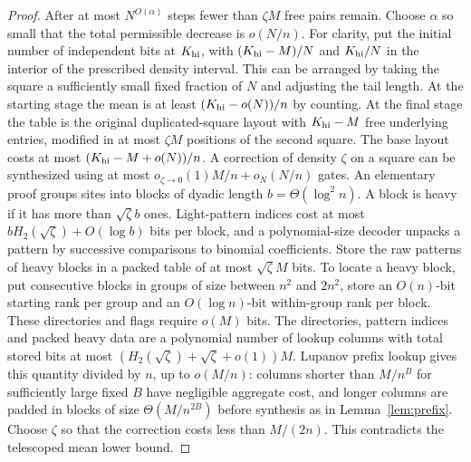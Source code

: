 \documentclass[11pt]{article}
\begin{document}
\begin{proof}
After at most $N^{O(\alpha)}$ steps fewer than $\zeta M$ free pairs remain. Choose $\alpha$ so small that the total permissible decrease is $o(N/n)$. For clarity, put the initial number of independent bits at $K_{\rm hi}$, with $(K_{\rm hi}-M)/N$ and $K_{\rm hi}/N$ in the interior of the prescribed density interval. This can be arranged by taking the square a sufficiently small fixed fraction of $N$ and adjusting the tail length. At the starting stage the mean is at least $(K_{\rm hi}-o(N))/n$ by counting. At the final stage the table is the original duplicated-square layout with $K_{\rm hi}-M$ free underlying entries, modified in at most $\zeta M$ positions of the second square. The base layout costs at most $(K_{\rm hi}-M+o(N))/n$. A correction of density $\zeta$ on a square can be synthesized using at most $o_{\zeta\to0}(1)M/n+o_N(N/n)$ gates. An elementary proof groups sites into blocks of dyadic length $b=\Theta(\log^2 n)$. A block is heavy if it has more than $\sqrt\zeta b$ ones. Light-pattern indices cost at most $bH_2(\sqrt\zeta)+O(\log b)$ bits per block, and a polynomial-size decoder unpacks a pattern by successive comparisons to binomial coefficients. Store the raw patterns of heavy blocks in a packed table of at most $\sqrt\zeta M$ bits. To locate a heavy block, put consecutive blocks in groups of size between $n^2$ and $2n^2$, store an $O(n)$-bit starting rank per group and an $O(\log n)$-bit within-group rank per block. These directories and flags require $o(M)$ bits. The directories, pattern indices and packed heavy data are a polynomial number of lookup columns with total stored bits at most $(H_2(\sqrt\zeta)+\sqrt\zeta+o(1))M$. Lupanov prefix lookup gives this quantity divided by $n$, up to $o(M/n)$: columns shorter than $M/n^B$ for sufficiently large fixed $B$ have negligible aggregate cost, and longer columns are padded in blocks of size $\Theta(M/n^{2B})$ before synthesis as in Lemma~\ref{lem:prefix}. Choose $\zeta$ so that the correction costs less than $M/(2n)$. This contradicts the telescoped mean lower bound.


\end{proof}
\end{document}
